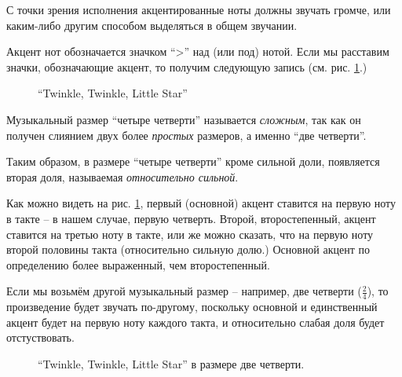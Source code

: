 \documentclass[a4paper,twoside]{book}
\newcounter{example-counter}
\begin{document}
С точки зрения исполнения акцентированные ноты должны звучать громче, или
каким-либо другим способом выделяться в общем звучании.

Акцент нот обозначается значком ``>'' над (или под) нотой.  Если мы расставим
значки, обозначающие акцент, то получим следующую запись
(см. рис. \ref{fig:lilypond-musical-scale-example-2}.)

\begin{figure}[ht]
  \caption{``Twinkle, Twinkle, Little Star''}
  \centering
  \label{fig:lilypond-musical-scale-example-2}
\end{figure}

Музыкальный размер ``четыре четверти'' называется \emph{сложным}, так как он
получен слиянием двух более \emph{простых} размеров, а именно ``две четверти''.

Таким образом, в размере ``четыре четверти'' кроме сильной доли, появляется
вторая доля, называемая \emph{относительно сильной}.

Как можно видеть на рис. \ref{fig:lilypond-musical-scale-example-2}, первый
(основной) акцент ставится на первую ноту в такте -- в нашем случае, первую
четверть.  Второй, второстепенный, акцент ставится на третью ноту в такте, или
же можно сказать, что на первую ноту второй половины такта (относительно сильную
долю.)  Основной акцент по определению более выраженный, чем второстепенный.

Если мы возьмём другой музыкальный размер -- например, две четверти
($\frac{2}{4}$), то произведение будет звучать по-другому, поскольку основной и
единственный акцент будет на первую ноту каждого такта, и относительно слабая
доля будет отстуствовать.

\begin{figure}[ht]
  \caption{``Twinkle, Twinkle, Little Star'' в размере две четверти.}
  \centering
  \label{fig:lilypond-musical-scale-example-3}
\end{figure}
\end{document}
